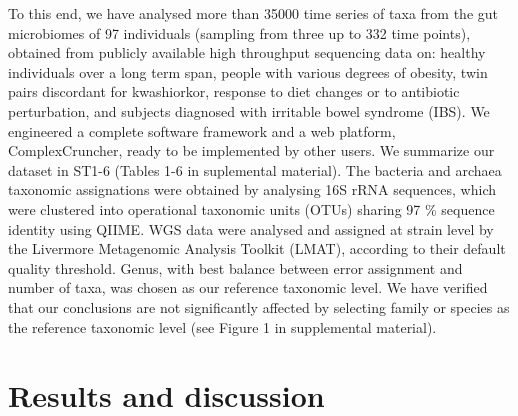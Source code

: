 \documentclass[11pt,oneside,letterpaper]{article}
\begin{document}
To this end, we have analysed more than 35000 time series of taxa from the gut microbiomes of 97 individuals (sampling from three up to 332 time points), obtained from publicly available high throughput sequencing data on: healthy individuals over a long term span\cite{moving}, people with various degrees of obesity\cite{lea}, twin pairs discordant for kwashiorkor\cite{kwashiorkor}, response to diet changes\cite{diet} or to antibiotic perturbation\cite{antibiotic}, and subjects diagnosed with irritable bowel syndrome (IBS)\cite{durban}. 
We engineered a complete software framework and a web platform, ComplexCruncher, ready to be implemented by other users.  
We summarize our dataset in ST1-6 (Tables 1-6 in suplemental material). The bacteria and archaea taxonomic assignations were obtained by analysing 16S rRNA sequences, which were clustered into operational taxonomic units (OTUs) sharing 97 \% sequence identity using QIIME\cite{qiime}. WGS data\cite{kwashiorkor} were analysed and assigned at strain level by the Livermore Metagenomic Analysis Toolkit (LMAT)\cite{lmat}, according to their default quality threshold. Genus, with best balance between error assignment and number of taxa, was chosen as our reference taxonomic level. We have verified that our conclusions are not significantly affected by selecting family or species as the reference taxonomic level (see Figure 1 in supplemental material).

\section*{Results and discussion}
\end{document}
